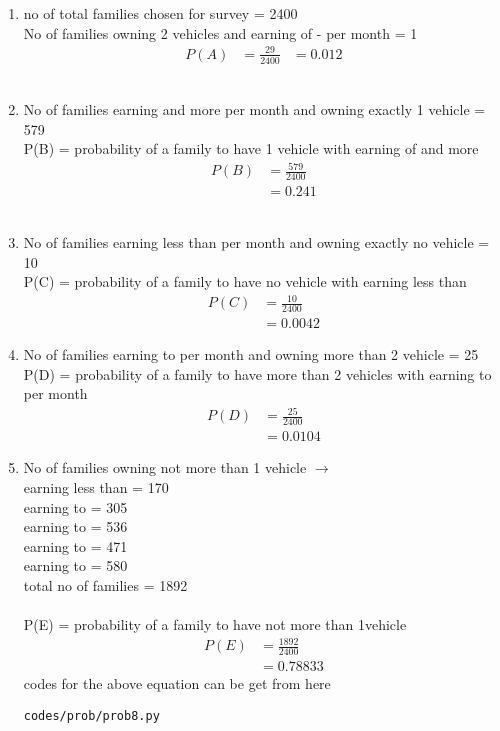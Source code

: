 \renewcommand{\theequation}{\theenumi}
\begin{enumerate}[label=\arabic*.,ref=\thesubsection.\theenumi]
\item no of total families chosen for survey = 2400
\\
No of families owning 2 vehicles and earning of  -  per month = 1
\begin{align}
P\left(A\right) &= \frac{29}{2400}
&= 0.012
\end{align}
\\
\item No of families earning  and more per month and owning exactly 1 vehicle = 579
\\
P(B) = probability of a family to have 1 vehicle with earning of  and more 
\begin{align}
P\left(B\right) &= \frac{579}{2400}
\\
&= 0.241
\end{align}
\\
\item No of families earning  less than   per month and owning exactly no vehicle = 10
\\
P(C) = probability of a family to have no vehicle with earning less than   
\begin{align}
P\left(C\right) &= \frac{10}{2400}
\\
&= 0.0042
\end{align}
\item No of families earning     to   per month and owning more than 2 vehicle = 25
\\
P(D) = probability of a family to have more than 2 vehicles with earning  to  per month   
\begin{align}
P\left(D\right) &= \frac{25}{2400}
\\
&= 0.0104
\end{align}
\item No of families owning not  more than 1 vehicle $\to$
\\
earning less than  = 170
\\
earning  to  = 305
\\
earning  to  = 536
\\
earning  to  = 471
\\
earning  to  = 580
\\
total no of families  = 1892
\\
\\
P(E) = probability of a family to have not more than 1vehicle    
\begin{align}
P\left(E\right) &= \frac{1892}{2400}
\\
&= 0.78833
\end{align}
codes for the above equation can be get from here
\begin{lstlisting}
codes/prob/prob8.py
\end{lstlisting}
\end{enumerate}